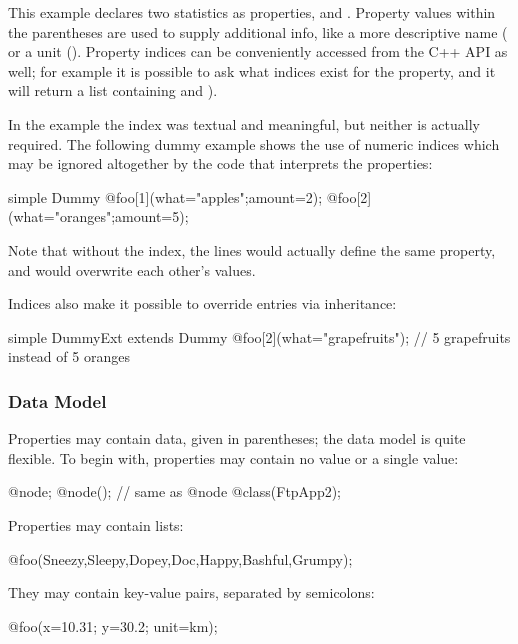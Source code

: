 This example declares two statistics as  properties,
 and . Property values within
the parentheses are used to supply additional info, like a more
descriptive name ( or a unit ().
Property indices can be conveniently accessed from the C++ API as
well; for example it is possible to ask what indices exist for the
 property, and it will return a list containing
 and ).

In the  example the index was textual and meaningful,
but neither is actually required. The following dummy example
shows the use of numeric indices which may be ignored altogether
by the code that interprets the properties:

\begin{ned}
simple Dummy {
    @foo[1](what="apples";amount=2);
    @foo[2](what="oranges";amount=5);
}
\end{ned}

Note that without the index, the lines would actually define the
same  property, and would overwrite each other's values.

Indices also make it possible to override entries via inheritance:

\begin{ned}
simple DummyExt extends Dummy {
    @foo[2](what="grapefruits"); // 5 grapefruits instead of 5 oranges
}
\end{ned}


\subsubsection{Data Model}

Properties may contain data, given in parentheses; the data model is quite
flexible. To begin with, properties may contain no value or a single
value:

\begin{ned}
@node;
@node(); // same as @node
@class(FtpApp2);
\end{ned}

Properties may contain lists:

\begin{ned}
@foo(Sneezy,Sleepy,Dopey,Doc,Happy,Bashful,Grumpy);
\end{ned}

They may contain key-value pairs, separated by semicolons:

\begin{ned}
@foo(x=10.31; y=30.2; unit=km);
\end{ned}

